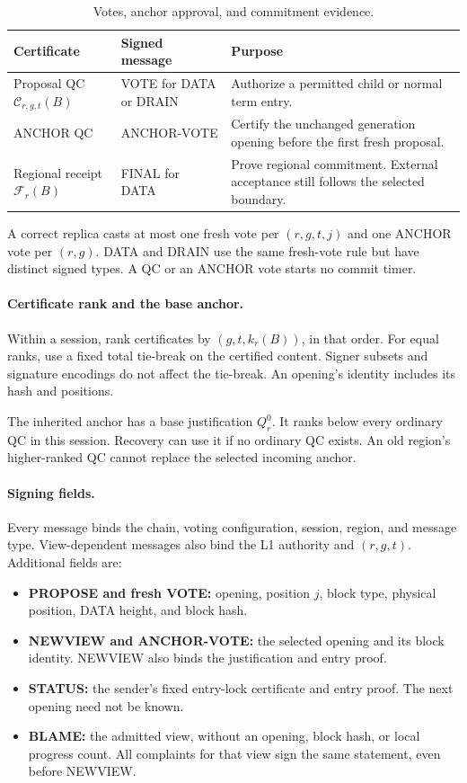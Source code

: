 \documentclass[11pt,a4paper]{article}
\newcommand{\QC}{\mathcal C}
\newcommand{\FC}{\mathcal F}
\begin{document}
\begin{table}[htbp]\centering\small
\caption{Votes, anchor approval, and commitment evidence.}
\label{tab:certificates}
\begin{tabularx}{\linewidth}{@{}>{\raggedright\arraybackslash}p{.25\linewidth}>{\raggedright\arraybackslash}p{.23\linewidth}Y@{}}
\toprule
Certificate & Signed message & Purpose\\
\midrule
Proposal QC $\QC_{r,g,t}(B)$ & VOTE for DATA or DRAIN & Authorize a
permitted child or normal term entry.\\
ANCHOR QC & ANCHOR-VOTE & Certify the unchanged generation opening
before the first fresh proposal.\\
Regional receipt $\FC_r(B)$ & FINAL for DATA & Prove regional
commitment. External acceptance still follows the selected boundary.\\
\bottomrule
\end{tabularx}
\end{table}

A correct replica casts at most one fresh vote per $(r,g,t,j)$ and
one ANCHOR vote per $(r,g)$.
DATA and DRAIN use the same fresh-vote rule but have distinct signed types.
A QC or an ANCHOR vote starts no commit timer.

\paragraph{Certificate rank and the base anchor.}
Within a session, rank certificates by $(g,t,k_r(B))$, in that order.
For equal ranks, use a fixed total tie-break on the certified content.
Signer subsets and signature encodings do not affect the tie-break.
An opening's identity includes its hash and positions.

The inherited anchor has a base justification $Q_r^0$.
It ranks below every ordinary QC in this session.
Recovery can use it if no ordinary QC exists.
An old region's higher-ranked QC cannot replace the selected incoming
anchor.

\paragraph{Signing fields.}
Every message binds the chain, voting configuration, session, region,
and message type. View-dependent messages also bind the L1 authority
and $(r,g,t)$. Additional fields are:
\begin{itemize}
\item \textbf{PROPOSE and fresh VOTE:} opening, position $j$, block type,
physical position, DATA height, and block hash.
\item \textbf{NEWVIEW and ANCHOR-VOTE:} the selected opening and its block
identity. NEWVIEW also binds the justification and entry proof.
\item \textbf{STATUS:} the sender's fixed entry-lock certificate and
entry proof. The next opening need not be known.
\item \textbf{BLAME:} the admitted view, without an opening, block hash,
or local progress count. All complaints for that view sign the same
statement, even before NEWVIEW.
\end{itemize}
\end{document}

